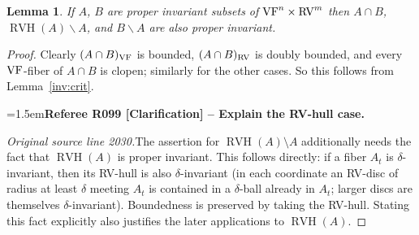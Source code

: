 \documentclass[12pt]{amsart}
\newcommand{\RefereeRemark}[4]{%
  \par\medskip\begingroup\normalfont\small\color{RefereePurple}%
  \emergencystretch=1.5em\noindent\textbf{Referee R#1 [#2] -- #3.}\par\nobreak\noindent #4\par
  \endgroup\medskip
}
\theoremstyle{plain}
\newtheorem{lem}[thm]{Lemma}
\theoremstyle{definition}
\theoremstyle{remark}
\numberwithin{equation}{section}
\theoremstyle{plain}
\newcommand{\VF}{\textup{VF}}
\newcommand{\RV}{\textup{RV}}
\newcommand{\0}{\emptyset}
\newcommand{\mi}{\smallsetminus}
\DeclareMathOperator{\RVH}{RVH}
\begin{document}
\begin{lem}\label{int:inv}
If $A$, $B$ are proper invariant subsets of $\VF^n \times \RV^m$ then $A \cap B$, $\RVH(A) \mi A$, and $B \mi A$ are also proper invariant.
\end{lem}
\begin{proof}
Clearly $(A \cap B)_{\VF}$ is bounded, $(A \cap B)_{\RV}$ is doubly bounded, and every $\VF$-fiber of $A \cap B$ is clopen; similarly for the other cases. So this follows from Lemma~\ref{inv:crit}.

\RefereeRemark{099}{Clarification}{Explain the RV-hull case}{%
\textit{Original source line 2030.}\quad The assertion for $\RVH(A)\setminus A$ additionally needs the fact that $\RVH(A)$ is proper invariant. This follows directly: if a fiber $A_t$ is $\delta$-invariant, then its RV-hull is also $\delta$-invariant (in each coordinate an RV-disc of radius at least $\delta$ meeting $A_t$ is contained in a $\delta$-ball already in $A_t$; larger discs are themselves $\delta$-invariant). Boundedness is preserved by taking the RV-hull. Stating this fact explicitly also justifies the later applications to $\RVH(A)$.
}
\end{proof}
\end{document}
